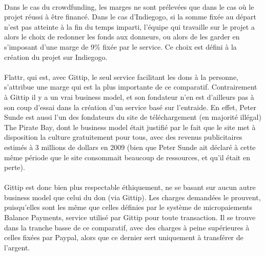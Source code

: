 \paragraph{}
Dans le cas du crowdfunding, les marges ne sont prélevées que dans le cas où le
projet réussi à être financé. Dans le cas d'Indiegogo, si la somme fixée au
départ n'est pas atteinte à la fin du temps imparti, l'équipe qui travaille sur
le projet a alors le choix de redonner les fonds aux donneurs, ou alors de les
garder en s'imposant d'une marge de 9\%{} fixée par le service. Ce choix est
défini à la création du projet sur Indiegogo.

\paragraph{}
Flattr, qui est, avec Gittip, le seul service facilitant les dons à la
personne, s'attribue une marge qui est la plus importante de ce comparatif.
Contrairement à Gittip il y a un vrai business model, et son fondateur n'en est
d'ailleurs pas à son coup d'essai dans la création d'un service basé sur
l'entraide. En effet, Peter Sunde est aussi l'un des fondateurs du site de
téléchargement (en majorité illégal) The Pirate Bay, dont le business model
était justifié par le fait que le site met à disposition la culture
gratuitement pour tous, avec des revenus publicitaires estimés à 3 millions de
dollars en 2009 (bien que Peter Sunde ait déclaré à cette même période que le
site consommait beaucoup de ressources, et qu'il était en perte).

\paragraph{}
Gittip est donc bien plus respectable éthiquement, ne se basant sur aucun autre
business model que celui du don (via Gittip). Les charges demandées le
prouvent, puisqu'elles sont les même que celles définies par le système de
micropaiements Balance Payments, service utilisé par Gittip pour toute
transaction. Il se trouve dans la tranche basse de ce comparatif, avec des
charges à peine supérieures à celles fixées par Paypal, alors que ce dernier
sert uniquement à transférer de l'argent.
\newpage

\begin{figure}[!t]
\end{figure}

